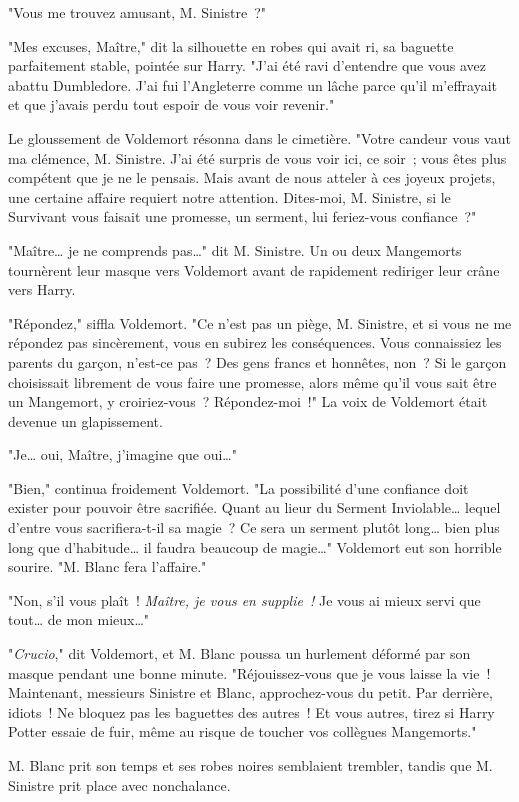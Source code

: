 "Vous me trouvez amusant, M. Sinistre~?"

"Mes excuses, Maître," dit la silhouette en robes qui avait ri, sa baguette parfaitement stable, pointée sur Harry. "J'ai été ravi d'entendre que vous avez abattu Dumbledore. J'ai fui l'Angleterre comme un lâche parce qu'il m'effrayait et que j'avais perdu tout espoir de vous voir revenir."

Le gloussement de Voldemort résonna dans le cimetière. "Votre candeur vous vaut ma clémence, M. Sinistre. J'ai été surpris de vous voir ici, ce soir~; vous êtes plus compétent que je ne le pensais. Mais avant de nous atteler à ces joyeux projets, une certaine affaire requiert notre attention. Dites-moi, M. Sinistre, si le Survivant vous faisait une promesse, un serment, lui feriez-vous confiance~?"

"Maître… je ne comprends pas…" dit M. Sinistre. Un ou deux Mangemorts tournèrent leur masque vers Voldemort avant de rapidement rediriger leur crâne vers Harry.

"Répondez," siffla Voldemort. "Ce n'est pas un piège, M. Sinistre, et si vous ne me répondez pas sincèrement, vous en subirez les conséquences. Vous connaissiez les parents du garçon, n'est-ce pas~? Des gens francs et honnêtes, non~? Si le garçon choisissait librement de vous faire une promesse, alors même qu'il vous sait être un Mangemort, y croiriez-vous~? Répondez-moi~!" La voix de Voldemort était devenue un glapissement.

"Je… oui, Maître, j'imagine que oui…"

"Bien," continua froidement Voldemort. "La possibilité d'une confiance doit exister pour pouvoir être sacrifiée. Quant au lieur du Serment Inviolable… lequel d'entre vous sacrifiera-t-il sa magie~? Ce sera un serment plutôt long… bien plus long que d'habitude… il faudra beaucoup de magie…" Voldemort eut son horrible sourire. "M. Blanc fera l'affaire."

"Non, s'il vous plaît~! \emph{Maître, je vous en supplie~!} Je vous ai mieux servi que tout… de mon mieux…"

"\emph{Crucio}," dit Voldemort, et M. Blanc poussa un hurlement déformé par son masque pendant une bonne minute. "Réjouissez-vous que je vous laisse la vie~! Maintenant, messieurs Sinistre et Blanc, approchez-vous du petit. Par derrière, idiots~! Ne bloquez pas les baguettes des autres~! Et vous autres, tirez si Harry Potter essaie de fuir, même au risque de toucher vos collègues Mangemorts."

M. Blanc prit son temps et ses robes noires semblaient trembler, tandis que M. Sinistre prit place avec nonchalance.

